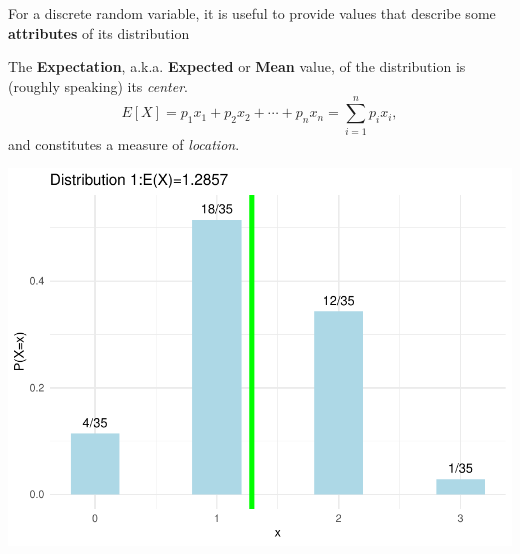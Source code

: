 \documentclass[smaller, handout]{beamer}\usepackage[]{graphicx}\usepackage[]{color}
\newenvironment{knitrout}{}{} %
\begin{document}
\begin{frame}{\secname}
For a discrete random variable, it is useful to provide values that describe some
  \textbf{attributes} of its distribution
  \pause
  \begin{definition}
  \begin{footnotesize}
  The \textbf{Expectation}, a.k.a. \textbf{Expected} or \textbf{Mean} value, of the
  distribution is (roughly speaking) its \emph{center}.
  \begin{equation*}
  E\left[ X\right] =p_{1}x_{1}+p_{2}x_{2}+\cdots + p_{n}x_{n} = \sum_{i=1}^{n} p_i x_i,
  \end{equation*}%
  and constitutes a measure of \emph{location}.
  \end{footnotesize}
  \end{definition}
  \pause
\begin{knitrout}
\color{fgcolor}

\includegraphics[width=0.5\linewidth]{figure/unnamed-chunk-3-1} \hfill{}



\end{knitrout}
\end{frame}
\end{document}

